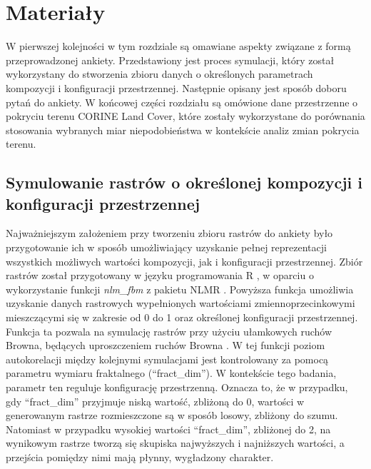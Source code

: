 \documentclass{amuthesis}
\begin{document}

\hypertarget{sec-materialy}{%
\chapter{Materiały}\label{sec-materialy}}

W pierwszej kolejności w tym rozdziale są omawiane aspekty związane z
formą przeprowadzonej ankiety. Przedstawiony jest proces symulacji,
który został wykorzystany do stworzenia zbioru danych o określonych
parametrach kompozycji i konfiguracji przestrzennej. Następnie opisany
jest sposób doboru pytań do ankiety. W końcowej części rozdziału są
omówione dane przestrzenne o pokryciu terenu CORINE Land Cover, które
zostały wykorzystane do porównania stosowania wybranych miar
niepodobieństwa w kontekście analiz zmian pokrycia terenu.

\hypertarget{sec-symulowanie}{%
\section{Symulowanie rastrów o określonej kompozycji i konfiguracji
przestrzennej}\label{sec-symulowanie}}

Najważniejszym założeniem przy tworzeniu zbioru rastrów do ankiety było
przygotowanie ich w sposób umożliwiający uzyskanie pełnej reprezentacji
wszystkich możliwych wartości kompozycji, jak i konfiguracji
przestrzennej. Zbiór rastrów został przygotowany w języku programowania
R \autocite{R2023}, w oparciu o wykorzystanie funkcji \emph{nlm\_fbm} z
pakietu NLMR \autocite{NLMR2018}. Powyższa funkcja umożliwia uzyskanie
danych rastrowych wypełnionych wartościami zmiennoprzecinkowymi
mieszczącymi się w zakresie od 0 do 1 oraz określonej konfiguracji
przestrzennej. Funkcja ta pozwala na symulację rastrów przy użyciu
ułamkowych ruchów Browna, będących uproszczeniem ruchów Browna
\autocite{nlm_fbm}. W tej funkcji poziom autokorelacji między kolejnymi
symulacjami jest kontrolowany za pomocą parametru wymiaru fraktalnego
(``fract\_dim''). W kontekście tego badania, parametr ten reguluje
konfigurację przestrzenną. Oznacza to, że w przypadku, gdy
``fract\_dim'' przyjmuje niską wartość, zbliżoną do 0, wartości w
generowanym rastrze rozmieszczone są w sposób losowy, zbliżony do szumu.
Natomiast w przypadku wysokiej wartości ``fract\_dim'', zbliżonej do 2,
na wynikowym rastrze tworzą się skupiska najwyższych i najniższych
wartości, a przejścia pomiędzy nimi mają płynny, wygładzony charakter.
\end{document}
